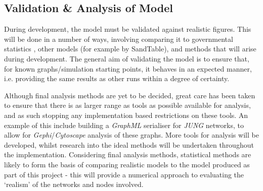 \documentclass[]{article}
\begin{document}
\subsection{Validation \& Analysis of Model}

During development, the model must be validated against realistic figures. This will be done in a number of ways, involving comparing it to governmental statistics \cite{SmokStats}, other models (for example by SandTable), and methods that will arise during development. The general aim of validating the model is to ensure that, for known graphs/simulation starting points, it behaves in an expected manner, i.e. providing the same results as other runs within a degree of certainty. 

Although final analysis methods are yet to be decided, great care has been taken to ensure that there is as larger range as tools as possible available for analysis, and as such stopping any implementation based restrictions on these tools. An example of this include building a \emph{GraphML} serialiser for \emph{JUNG} networks, to allow for \emph{Gephi}/\emph{Cytoscape} analysis of these graphs. More tools for analysis will be developed, whilst research into the ideal methods will be undertaken throughout the implementation. Considering final analysis methods, statistical methods are likely to form the basis of comparing realistic models to the model produced as part of this project - this will provide a numerical approach to evaluating the `realism' of the networks and nodes involved.
\end{document}
